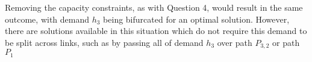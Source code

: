 Removing the capacity constraints, as with Question 4, would result in the same
outcome, with demand $h_3$ being bifurcated for an optimal solution. However,
there are solutions available in this situation which do not require this demand
to be split across links, such as by passing all of demand $h_3$ over path
$P_{3,2}$ or path $P_{1}$
